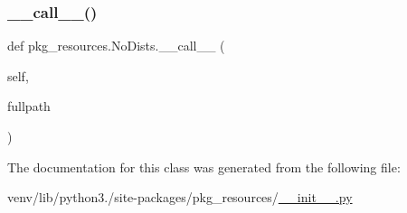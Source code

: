 \mbox{\label{classpkg__resources_1_1NoDists_a58f3f227544be750eae7ffa18dc683f6}} 
\subsubsection{\texorpdfstring{\+\_\+\+\_\+call\+\_\+\+\_\+()}{\_\_call\_\_()}}
{\footnotesize\ttfamily def pkg\+\_\+resources.\+No\+Dists.\+\_\+\+\_\+call\+\_\+\+\_\+ (\begin{DoxyParamCaption}\item[{}]{self,  }\item[{}]{fullpath }\end{DoxyParamCaption})}



The documentation for this class was generated from the following file\+:\begin{DoxyCompactItemize}
\item 
venv/lib/python3./site-\/packages/pkg\+\_\+resources/\hyperlink{venv_2lib_2python3_89_2site-packages_2pkg__resources_2____init_____8py}{\+\_\+\+\_\+init\+\_\+\+\_\+.\+py}\end{DoxyCompactItemize}

